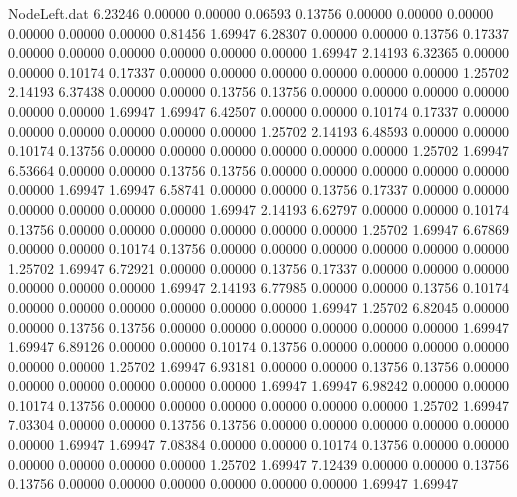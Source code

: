 \begin{filecontents}{NodeLeft.dat}
   6.23246    0.00000    0.00000     0.06593    0.13756    0.00000    0.00000    0.00000    0.00000    0.00000    0.00000    0.81456    1.69947
   6.28307    0.00000    0.00000     0.13756    0.17337    0.00000    0.00000    0.00000    0.00000    0.00000    0.00000    1.69947    2.14193
   6.32365    0.00000    0.00000     0.10174    0.17337    0.00000    0.00000    0.00000    0.00000    0.00000    0.00000    1.25702    2.14193
   6.37438    0.00000    0.00000     0.13756    0.13756    0.00000    0.00000    0.00000    0.00000    0.00000    0.00000    1.69947    1.69947
   6.42507    0.00000    0.00000     0.10174    0.17337    0.00000    0.00000    0.00000    0.00000    0.00000    0.00000    1.25702    2.14193
   6.48593    0.00000    0.00000     0.10174    0.13756    0.00000    0.00000    0.00000    0.00000    0.00000    0.00000    1.25702    1.69947
   6.53664    0.00000    0.00000     0.13756    0.13756    0.00000    0.00000    0.00000    0.00000    0.00000    0.00000    1.69947    1.69947
   6.58741    0.00000    0.00000     0.13756    0.17337    0.00000    0.00000    0.00000    0.00000    0.00000    0.00000    1.69947    2.14193
   6.62797    0.00000    0.00000     0.10174    0.13756    0.00000    0.00000    0.00000    0.00000    0.00000    0.00000    1.25702    1.69947
   6.67869    0.00000    0.00000     0.10174    0.13756    0.00000    0.00000    0.00000    0.00000    0.00000    0.00000    1.25702    1.69947
   6.72921    0.00000    0.00000     0.13756    0.17337    0.00000    0.00000    0.00000    0.00000    0.00000    0.00000    1.69947    2.14193
   6.77985    0.00000    0.00000     0.13756    0.10174    0.00000    0.00000    0.00000    0.00000    0.00000    0.00000    1.69947    1.25702
   6.82045    0.00000    0.00000     0.13756    0.13756    0.00000    0.00000    0.00000    0.00000    0.00000    0.00000    1.69947    1.69947
   6.89126    0.00000    0.00000     0.10174    0.13756    0.00000    0.00000    0.00000    0.00000    0.00000    0.00000    1.25702    1.69947
   6.93181    0.00000    0.00000     0.13756    0.13756    0.00000    0.00000    0.00000    0.00000    0.00000    0.00000    1.69947    1.69947
   6.98242    0.00000    0.00000     0.10174    0.13756    0.00000    0.00000    0.00000    0.00000    0.00000    0.00000    1.25702    1.69947
   7.03304    0.00000    0.00000     0.13756    0.13756    0.00000    0.00000    0.00000    0.00000    0.00000    0.00000    1.69947    1.69947
   7.08384    0.00000    0.00000     0.10174    0.13756    0.00000    0.00000    0.00000    0.00000    0.00000    0.00000    1.25702    1.69947
   7.12439    0.00000    0.00000     0.13756    0.13756    0.00000    0.00000    0.00000    0.00000    0.00000    0.00000    1.69947    1.69947

\end{filecontents}
